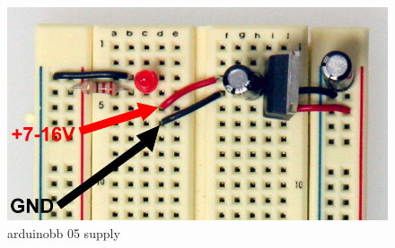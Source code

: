 \begin{figure}[!htb]
 \centering
 \includegraphics[scale=0.3]{img/arduino_breadboard/arduinobb_05_supply.jpg}
 \caption{arduinobb 05 supply}
 \label{arduinobb 05 supply}
\end{figure}


